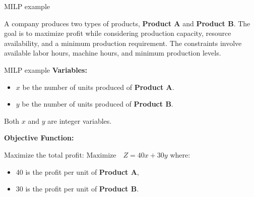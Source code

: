 \documentclass{beamer}
\begin{document}
\begin{frame}{MILP example}

A company produces two types of products, \textbf{Product A} and \textbf{Product B}. The goal is to maximize profit while considering production capacity, resource availability, and a minimum production requirement. The constraints involve available labor hours, machine hours, and minimum production levels.

\end{frame}
\begin{frame}{MILP example}
    \textbf{Variables:} \linebreak
    
    \begin{itemize}
        \item $x$ be the number of units produced of \textbf{Product A}.
        \item $y$ be the number of units produced of \textbf{Product B}.
    \end{itemize}
    
    Both $x$ and $y$ are integer variables.\linebreak
    
    \textbf{Objective Function:} \linebreak
    
    Maximize the total profit:
    $
    \text{Maximize} \quad Z = 40x + 30y
    $
    where:
    \begin{itemize}
        \item 40 is the profit per unit of \textbf{Product A},
        \item 30 is the profit per unit of \textbf{Product B}.
    \end{itemize}
    
\end{frame}
\end{document}

